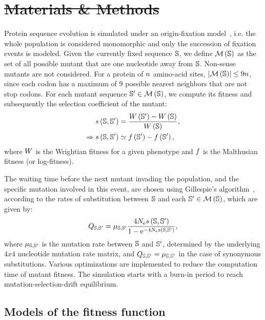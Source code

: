 \documentclass[authoryear]{elsarticle} %
\providecommand{\DIFaddtex}[1]{{\protect\color{blue}\uwave{#1}}} %
\providecommand{\DIFdeltex}[1]{{\protect\color{red}\sout{#1}}}                      %
\providecommand{\DIFaddbegin}{} %
\providecommand{\DIFaddend}{} %
\providecommand{\DIFdelbegin}{} %
\providecommand{\DIFdelend}{} %
\providecommand{\DIFadd}[1]{\texorpdfstring{\DIFaddtex{#1}}{#1}} %
\providecommand{\DIFdel}[1]{\texorpdfstring{\DIFdeltex{#1}}{}} %
\begin{document}
\section{\DIFdelbegin \DIFdel{Materials \& Methods}\DIFdelend \DIFaddbegin \DIFadd{Appendix}\DIFaddend }
Protein sequence evolution is simulated under an origin-fixation model~\citep{McCandlish2014}, i.e. the whole population is considered monomorphic and only the succession of fixation events is modeled.
Given the currently fixed sequence $\mathbb{S}$, we define $\mathcal{M}\left(\mathbb{S}\right)$ as the set of all possible mutant that are one nucleotide away from $\mathbb{S}$.
Non-sense mutants are not considered.
For a protein of $n$ amino-acid sites, $\left| \mathcal{M}\left(\mathbb{S}\right) \right| \leq 9 n$, since each {codon} has a maximum of $9$ possible nearest neighbors that are not stop {codons}.
For each mutant sequence $\mathbb{S}' \in \mathcal{M}\left(\mathbb{S}\right)$, we compute its fitness and subsequently the selection coefficient of the mutant:
\begin{align}
    s \left( \mathbb{S},\mathbb{S}'\right) & = \dfrac{ W \left(\mathbb{S}' \right) - W \left(\mathbb{S}\right) }{ W \left( \mathbb{S}\right)}, \\
    \Rightarrow s \left( \mathbb{S},\mathbb{S}'\right) & \simeq  f \left(\mathbb{S}' \right) -   f \left(\mathbb{S}' \right),
\end{align}
where $W$ is the Wrightian fitness for a given {phenotype} and $f $ is the Malthusian fitness (or log-fitness).

The waiting time before the next mutant invading the population, and the specific mutation involved in this event, are chosen using Gillespie’s algorithm~\citep{Gillespie1977}, according to the rates of {substitution} between $\mathbb{S}$ and each $\mathbb{S}' \in \mathcal{M}\left(\mathbb{S}\right)$, which are given by:
\begin{equation}
    Q_{\mathbb{S}, \mathbb{S}'} = \mu_{\mathbb{S}, \mathbb{S}'} \dfrac{4 N_{\text{e}} s \left( \mathbb{S},\mathbb{S}'\right)}{1 - \text{e}^{-4 N_{\text{e}} s \left( \mathbb{S},\mathbb{S}'\right)}},
\end{equation}
where $\mu_{\mathbb{S}, \mathbb{S}'}$ is the mutation rate between $\mathbb{S}$ and $\mathbb{S}'$, determined by the underlying $4x4$ nucleotide mutation rate matrix, and ${Q_{\mathbb{S}, \mathbb{S}'}} = \mu_{\mathbb{S}, \mathbb{S}'}$ in the case of {synonymous} {substitutions}.
Various optimizations are implemented to reduce the computation time of mutant fitness.
The simulation starts with a burn-in period to reach mutation-selection-drift equilibrium.

\subsection{Models of the fitness function}
\label{MatMet:folding}
\end{document}
